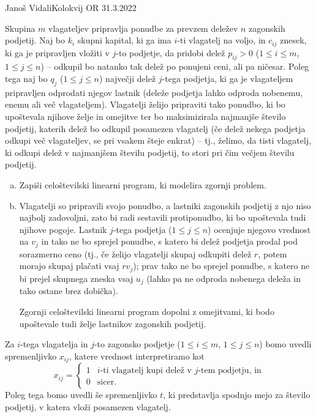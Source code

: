 \begin{naloga}{Janoš Vidali}{Kolokvij OR 31.3.2022}
\begin{vprasanje}
Skupina $m$ vlagateljev pripravlja ponudbe
za prevzem deležev $n$ zagonskih podjetij.
Naj bo $k_i$ skupni kapital, ki ga ima $i$-ti vlagatelj na voljo,
in $c_{ij}$ znesek, ki ga je pripravljen vložiti v $j$-to podjetje,
da pridobi delež $p_{ij} > 0$ ($1 \le i \le m$, $1 \le j \le n$)
-- odkupil bo natanko tak delež po ponujeni ceni, ali pa ničesar.
Poleg tega naj bo $q_j$ ($1 \le j \le n$) največji delež $j$-tega podjetja,
ki ga je vlagateljem pripravljen odprodati njegov lastnik
(deleže podjetja lahko odproda nobenemu, enemu ali več vlagateljem).
Vlagatelji želijo pripraviti tako ponudbo,
ki bo upoštevala njihove želje in omejitve
ter bo maksimizirala najmanjše število podjetij,
katerih delež bo odkupil posamezen vlagatelj
(če delež nekega podjetja odkupi več vlagateljev,
se pri vsakem šteje enkrat)
-- tj., želimo, da tisti vlagatelj,
ki odkupi delež v najmanjšem številu podjetij,
to stori pri čim večjem številu podjetij.

\begin{enumerate}[(a)]
\item Zapiši celoštevilski linearni program, ki modelira zgornji problem.

\item Vlagatelji so pripravili svojo ponudbo,
a lastniki zagonskih podjetij z njo niso najbolj zadovoljni,
zato bi radi sestavili protiponudbo, ki bo upoštevala tudi njihove pogoje.
Lastnik $j$-tega podjetja ($1 \le j \le n$)
ocenjuje njegovo vrednost na $v_j$ in tako ne bo sprejel ponudbe,
s katero bi delež podjetja prodal pod sorazmerno ceno
(tj., če želijo vlagatelji skupaj odkupiti delež $r$,
potem morajo skupaj plačati vsaj $r v_j$);
prav tako ne bo sprejel ponudbe,
s katero ne bi prejel skupnega zneska vsaj $u_j$
(lahko pa ne odproda nobenega deleža in tako ostane brez dobička).

Zgornji celoštevilski linearni program dopolni z omejitvami,
ki bodo upoštevale tudi želje last\-ni\-kov zagonskih podjetij.
\end{enumerate}
\end{vprasanje}

\begin{odgovor}
Za $i$-tega vlagatelja in $j$-to zagonsko podjetje
($1 \le i \le m$, $1 \le j \le n$)
bomo uvedli spremenljivko $x_{ij}$,
katere vrednost interpretiramo kot
$$
x_{ij} = \begin{cases}
1 & \text{$i$-ti vlagatelj kupi delež v $j$-tem podjetju, in} \\
0 & \text{sicer.}
\end{cases}
$$
Poleg tega bomo uvedli še spremenljivko $t$,
ki predstavlja spodnjo mejo za število podjetij,
v katera vloži posamezen vlagatelj.


\end{odgovor}
\end{naloga}
